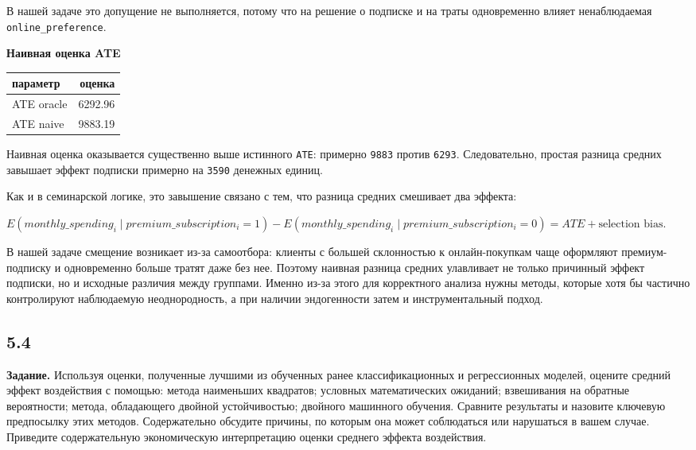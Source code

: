 \documentclass[11pt]{article}
\newcounter{none}
\begin{document}
В нашей задаче это допущение не выполняется, потому что на решение о
подписке и на траты одновременно влияет ненаблюдаемая
\texttt{online\_preference}.

    \textbf{Наивная оценка ATE}

{\def\LTcaptype{none} %
\begin{longtable}[]{@{}lr@{}}
\toprule\noalign{}
параметр & оценка \\
\midrule\noalign{}
\endhead
\bottomrule\noalign{}
\endlastfoot
ATE oracle & 6292.96 \\
ATE naive & 9883.19 \\
\end{longtable}
}

    Наивная оценка оказывается существенно выше истинного \texttt{ATE}:
примерно \texttt{9883} против \texttt{6293}. Следовательно, простая
разница средних завышает эффект подписки примерно на \texttt{3590}
денежных единиц.

Как и в семинарской логике, это завышение связано с тем, что разница
средних смешивает два эффекта:

\begin{center}
\begin{adjustbox}{max width=\linewidth}
\(\displaystyle E(monthly\_spending_i \mid premium\_subscription_i = 1) - E(monthly\_spending_i \mid premium\_subscription_i = 0) = ATE + \text{selection bias}.\)
\end{adjustbox}
\end{center}

В нашей задаче смещение возникает из-за самоотбора: клиенты с большей
склонностью к онлайн-покупкам чаще оформляют премиум-подписку и
одновременно больше тратят даже без нее. Поэтому наивная разница средних
улавливает не только причинный эффект подписки, но и исходные различия
между группами. Именно из-за этого для корректного анализа нужны методы,
которые хотя бы частично контролируют наблюдаемую неоднородность, а при
наличии эндогенности затем и инструментальный подход.

    \subsection{5.4}\label{section}

\textbf{Задание.} Используя оценки, полученные лучшими из обученных
ранее классификационных и регрессионных моделей, оцените средний эффект
воздействия с помощью: метода наименьших квадратов; условных
математических ожиданий; взвешивания на обратные вероятности; метода,
обладающего двойной устойчивостью; двойного машинного обучения. Сравните
результаты и назовите ключевую предпосылку этих методов. Содержательно
обсудите причины, по которым она может соблюдаться или нарушаться в
вашем случае. Приведите содержательную экономическую интерпретацию
оценки среднего эффекта воздействия.
\end{document}
